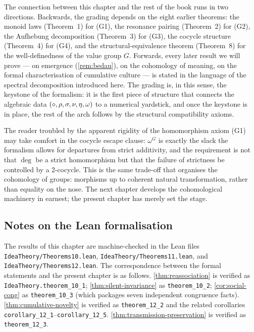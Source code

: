 The connection between this chapter and the rest of the book runs in
two directions. Backwards, the grading depends on the eight earlier
theorems: the monoid laws (Theorem~1) for (G1), the resonance pairing
(Theorem~2) for (G2), the Aufhebung decomposition (Theorem~3) for
(G3), the cocycle structure (Theorem~4) for (G4), and the
structural-equivalence theorem (Theorem~8) for the well-definedness of
the value group $G$. Forwards, every later result we will prove ---
on emergence (\cref{rem:bedau}), on the cohomology of meaning, on the
formal characterisation of cumulative culture --- is stated in the
language of the spectral decomposition introduced here. The grading
is, in this sense, the keystone of the formalism: it is the first
piece of structure that connects the algebraic data
$(\mathbin{\diamond},\rho,\sigma,\nu,\eta,\omega)$ to a numerical
yardstick, and once the keystone is in place, the rest of the arch
follows by the structural compatibility axioms.

The reader troubled by the apparent rigidity of the homomorphism axiom
(G1) may take comfort in the cocycle escape clause: $\omega^G$ is
exactly the slack the formalism allows for departures from strict
additivity, and the requirement is not that $\deg$ be a strict
homomorphism but that the failure of strictness be controlled by a
$2$-cocycle. This is the same trade-off that organises the cohomology
of groups: morphisms up to coherent natural transformation, rather
than equality on the nose. The next chapter develops the cohomological
machinery in earnest; the present chapter has merely set the stage.

\subsection*{Notes on the Lean formalisation}

The results of this chapter are machine-checked in the Lean files
\texttt{IdeaTheory/Theorems10.lean},
\texttt{IdeaTheory/Theorems11.lean}, and
\texttt{IdeaTheory/Theorems12.lean}. The correspondence between the
formal statements and the present chapter is as follows.
\cref{thm:reassociation} is verified as
\texttt{IdeaTheory.theorem\_10\_1};
\cref{thm:silent-invariance} as \texttt{theorem\_10\_2};
\cref{cor:social-cong} as \texttt{theorem\_10\_3} (which packages
seven independent congruence facts).
\cref{thm:cumulative-novelty} is verified as
\texttt{theorem\_12\_2} and the related corollaries
\texttt{corollary\_12\_1}--\texttt{corollary\_12\_5}.
\cref{thm:transmission-preservation} is verified as
\texttt{theorem\_12\_3}.

